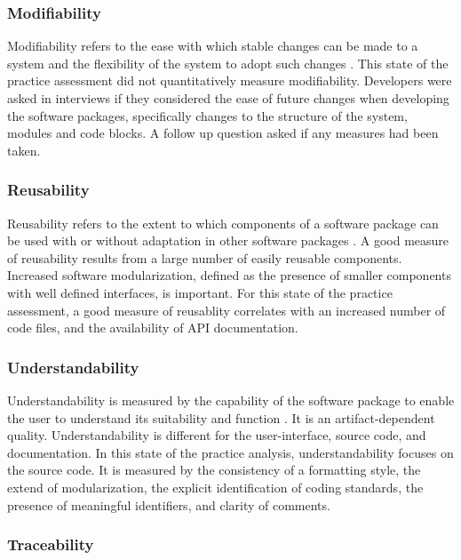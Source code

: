 \documentclass[12pt, notitlepage]{article}
\begin{document}
\subsubsection{Modifiability}

Modifiability refers to the ease with which stable changes can be made to a system and the flexibility of the system to adopt such changes \citep{8016712}.
This state of the practice assessment did not quantitatively measure modifiability. Developers were asked in interviews if they considered the ease of future changes when developing the software packages, specifically changes to the structure of the system, modules and code blocks. A follow up question asked if any measures had been taken.

\subsubsection{Reusability}

Reusability refers to the extent to which components of a software package can be used with or without adaptation in other software packages \citep{kalagiakos2003non}. A good measure of reusability results from a large number of easily reusable components. Increased software modularization, defined as the presence of smaller components with well defined interfaces, is important. For this state of the practice assessment, a good measure of reusablity correlates with an increased number of code files, and the availability of API documentation.

\subsubsection{Understandability}

Understandability is measured by the capability of the software package to enable the user to understand its suitability and function \citep{ISO9126}.
It is an artifact-dependent quality. Understandability is different for the user-interface, source code, and documentation. In this state of the practice analysis, understandability focuses on the source code. It is measured by the consistency of a formatting style, the extend of modularization, the explicit identification of coding standards, the presence of meaningful identifiers, and clarity of comments. 

\subsubsection{Traceability}
\end{document}

